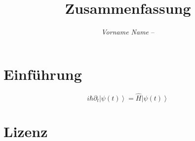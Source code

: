 \documentclass[]{tex/hsrzf}
\author{\textsl{Vorname Name} -- \texttt{\theauthoremail}}
\title{\texttt{\themodule} Zusammenfassung}
\date{\thesemester}
\begin{document}
\maketitle
\tableofcontents

\section{Einf\"uhrung}
\[
  i\hbar \partial_t \left| \psi(t) \right\rangle 
    = \hat{H} \left| \psi(t) \right\rangle
\]


\section{Lizenz}
\doclicenseThis
\end{document}
